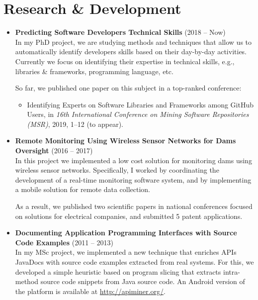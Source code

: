 \section*{Research \& Development}
\begin{itemize}

  \item \textbf{Predicting Software Developers Technical Skills} (2018 -- Now) \\
  In my PhD project, we are studying methods and techniques that allow us to automatically identify developers skills based on their day-by-day activities. Currently we focus on identifying their expertise in technical skills, e.g., libraries \& frameworks, programming language, etc.

  So far, we published one paper on this subject in a top-ranked conference:
  \begin{itemize}
    \item Identifying Experts on Software Libraries and Frameworks among GitHub Users, in \textit{16th International Conference on Mining Software Repositories (MSR)}, 2019, 1--12 (to appear).
  \end{itemize} 

  \item \textbf{Remote Monitoring Using Wireless Sensor Networks for Dams Oversight} (2016 -- 2017) \\
  In this project  we implemented a low cost solution for monitoring dams using wireless sensor networks. Specifically, I worked by coordinating the development of a real-time monitoring software system, and by implementing a mobile solution for remote data collection.

  As a result, we published two scientific papers in national conferences focused on solutions for electrical companies, and submitted 5 patent applications.

  \item \textbf{Documenting Application Programming Interfaces with Source Code Examples} (2011 -- 2013) \\
  In my MSc project, we implemented a new technique that enriches APIs JavaDocs with source code examples extracted from real systems. For this, we developed a simple heuristic based on program slicing that extracts intra-method source code snippets from Java source code. An Android version of the platform is available at \url{http://apiminer.org/}.


\end{itemize}
